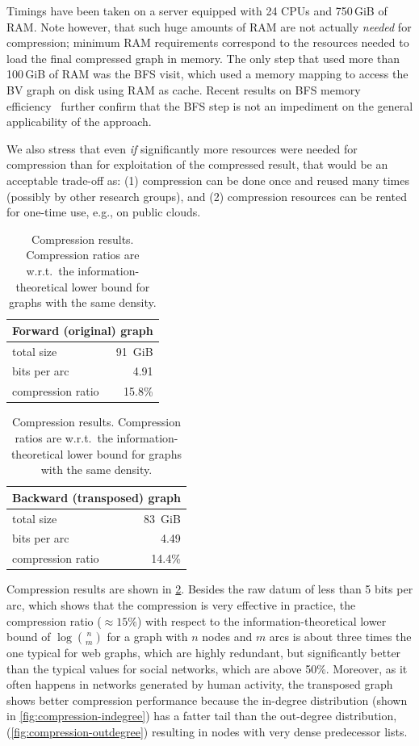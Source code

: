 Timings have been taken on a server equipped with 24 CPUs and 750\,GiB of
RAM\@. Note however, that such huge amounts of RAM are not actually
\emph{needed} for compression; minimum RAM requirements correspond to the
resources needed to load the final compressed graph in memory. The only step
that used more than 100\,GiB of RAM was the BFS visit, which used a memory
mapping to access the BV graph on disk using RAM as cache. Recent results on
BFS memory efficiency~\cite{hagerup2019bfs} further confirm that the BFS step
is not an impediment on the general applicability of the approach.

We also stress that even \emph{if} significantly more resources were needed for
compression than for exploitation of the compressed result, that would be an
acceptable trade-off as: (1) compression can be done once and reused many times
(possibly by other research groups), and (2) compression resources can be
rented for one-time use, e.g., on public clouds.

\smallskip

\begin{table}
  \centering
  \caption{Compression results. Compression ratios are w.r.t.~the
    information-theoretical lower bound for graphs with the same density.}%
  \label{tab:compression-bfs-results}

  \hfill
  \begin{tabular}{lr}
    \multicolumn{2}{c}{\textbf{Forward (original) graph}} \\
    \hline\hline
    total size         & 91~GiB \\
    bits per arc       & 4.91 \\
    compression ratio  & 15.8\% \\
    \hline
  \end{tabular}
  \hfill
  \begin{tabular}{lr}
    \multicolumn{2}{c}{\textbf{Backward (transposed) graph}} \\
    \hline\hline
    total size         & 83~GiB \\
    bits per arc       & 4.49  \\
    compression ratio  & 14.4\% \\
    \hline
  \end{tabular}
  \hfill
\end{table}

Compression results are shown in \cref{tab:compression-bfs-results}.
Besides the raw datum of less than 5 bits per arc, which shows that the
compression is very effective in practice, the compression ratio
($\approx 15\%$) with respect to the information-theoretical lower bound of
$\log {n\choose m}$ for a graph with $n$ nodes and $m$ arcs is about three
times the one typical for web graphs, which are highly redundant, but
significantly better than the typical values for social networks, which are
above 50\%. Moreover, as it often happens in networks generated by human
activity, the transposed graph shows better compression performance because the
in-degree distribution (shown in \cref{fig:compression-indegree}) has a fatter
tail than the out-degree distribution, (\cref{fig:compression-outdegree})
resulting in nodes with very dense predecessor lists.

